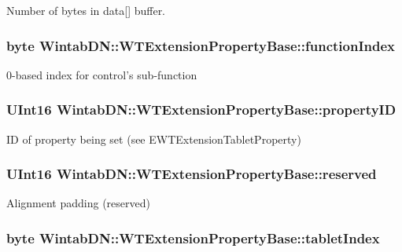 Number of bytes in data\mbox{[}\mbox{]} buffer. 

\hypertarget{struct_wintab_d_n_1_1_w_t_extension_property_base_a0c4b63f73615120e7e234ae27b4482ee}{
\subsubsection[{functionIndex}]{\setlength{\rightskip}{0pt plus 5cm}byte {\bf WintabDN::WTExtensionPropertyBase::functionIndex}}}
\label{struct_wintab_d_n_1_1_w_t_extension_property_base_a0c4b63f73615120e7e234ae27b4482ee}


0-\/based index for control's sub-\/function 

\hypertarget{struct_wintab_d_n_1_1_w_t_extension_property_base_a01f5a7c7a3aecada5a4c9d6ab2b63a8e}{
\subsubsection[{propertyID}]{\setlength{\rightskip}{0pt plus 5cm}UInt16 {\bf WintabDN::WTExtensionPropertyBase::propertyID}}}
\label{struct_wintab_d_n_1_1_w_t_extension_property_base_a01f5a7c7a3aecada5a4c9d6ab2b63a8e}


ID of property being set (see EWTExtensionTabletProperty) 

\hypertarget{struct_wintab_d_n_1_1_w_t_extension_property_base_ad91637900f8dcafba84a476539748dfd}{
\subsubsection[{reserved}]{\setlength{\rightskip}{0pt plus 5cm}UInt16 {\bf WintabDN::WTExtensionPropertyBase::reserved}}}
\label{struct_wintab_d_n_1_1_w_t_extension_property_base_ad91637900f8dcafba84a476539748dfd}


Alignment padding (reserved) 

\hypertarget{struct_wintab_d_n_1_1_w_t_extension_property_base_acc18cec8a354e50809557a5cdfd017dc}{
\subsubsection[{tabletIndex}]{\setlength{\rightskip}{0pt plus 5cm}byte {\bf WintabDN::WTExtensionPropertyBase::tabletIndex}}}
\label{struct_wintab_d_n_1_1_w_t_extension_property_base_acc18cec8a354e50809557a5cdfd017dc}



